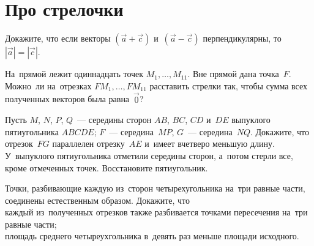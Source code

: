 
\section*{Про стрелочки}


\begin{problems}
\let\ov\overrightarrow

\item
Докажите, что если векторы $(\ov{a} + \ov{c})$ и~$(\ov{a} - \ov{c})$
перпендикулярны, то~\mbox{$|\ov{a}| = |\ov{c}|$}.

\item
На~прямой лежит одиннадцать точек $M_{1}, \ldots, M_{11}$.
Вне прямой дана точка~$F$.
Можно~ли на~отрезках $F M_{1}, \ldots, FM_{11}$ расставить стрелки
так, чтобы сумма всех полученных векторов была равна~$\ov{0}$?

\item
\subproblem
Пусть $M$, $N$, $P$, $Q$~--- середины сторон $AB$, $BC$, $CD$ и~$DE$
выпуклого пятиугольника $ABCDE$;
$F$~--- середина~$MP$, $G$~--- середина~$NQ$.
Докажите, что отрезок~$FG$ параллелен отрезку~$AE$ и~имеет вчетверо меньшую
длину.
\\
\subproblem
У~выпуклого пятиугольника отметили середины сторон, а~потом стерли все, кроме
отмеченных точек.
Восстановите пятиугольник.

\end{problems}

\begingroup
\ifx\problemfigurewidth\undefined
\newlength\problemfigurewidth
\newlength\problemtextwidth
\newlength\spacewidth
\fi
\setlength\problemfigurewidth{2cm}
\setlength\spacewidth{1em}
\setlength\problemtextwidth{\linewidth}
\addtolength\problemtextwidth{-\problemfigurewidth}
\addtolength\problemtextwidth{-\spacewidth}
\begin{minipage}{\problemtextwidth}
\begin{problems}
\item
Точки, разбивающие каждую из~сторон четырехугольника на~три равные части,
соединены естественным образом.
Докажите, что
\\
\subproblem
каждый из~полученных отрезков также разбивается точками пересечения на~три
равные части;
\\
\subproblem
площадь среднего четыреухгольника в~девять раз меньше площади исходного.
\end{problems}
\end{minipage}\hspace{\spacewidth}%
\begin{minipage}{\problemfigurewidth}
\end{minipage}
\endgroup

